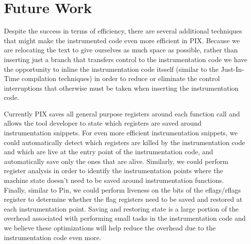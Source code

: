 \section{Future Work}

Despite the success in terms of efficiency, there are several additional techniques
that might make the instrumented code even more efficient in PIX. Because we are relocating
the text to give ourselves as much space as possible, rather than inserting just a branch
that transfers control to the instrumentation code we have the opportunity to inline
the instrumentation code itsself (similar to the Just-In-Time compilation techniques) 
in order to reduce or eliminate the control interruptions  that otherwise must be taken 
when inserting the instrumentation code.

Currently PIX saves all general purpose registers around each function call and allows the
tool developer to state which registers are saved around instrumentation snippets. For even more efficient instrumentation
snippets, we could automatically detect which registers are killed by the instrumentation code and which are live at the entry point
of the instrumentation code, and automatically save only the ones that are alive. Similarly, we could perform register 
analysis in order to identify the instrumentation points where the machine state doesn't need to be saved around instrumentation functions. 
Finally, similar to Pin, we could perform liveness on the bits of the eflags/rflags register to determine whether the flag registers need to be saved and
restored at each instrumentation point. Saving and restoring state is a large portion of the overhead associated with performing
small tasks in the instrumentation code and we believe these optimizations will help reduce the overhead due to the instrumentation code even more.


